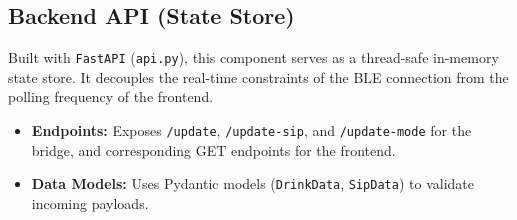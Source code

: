 \documentclass[12pt]{article}
\begin{document}
\subsection{Backend API (State Store)}
Built with \texttt{FastAPI} (\texttt{api.py}), this component serves as a thread-safe in-memory state store. It decouples the real-time constraints of the BLE connection from the polling frequency of the frontend.
\begin{itemize}
    \item \textbf{Endpoints:} Exposes \texttt{/update}, \texttt{/update-sip}, and \texttt{/update-mode} for the bridge, and corresponding GET endpoints for the frontend.
    \item \textbf{Data Models:} Uses Pydantic models (\texttt{DrinkData}, \texttt{SipData}) to validate incoming payloads.
\end{itemize}
\end{document}
